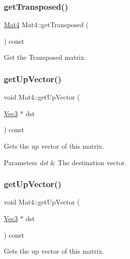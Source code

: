 \subsubsection{\texorpdfstring{get\+Transposed()}{getTransposed()}\hspace{0.1cm}{\footnotesize\ttfamily [2/2]}}
{\footnotesize\ttfamily \hyperlink{classMat4}{Mat4} Mat4\+::get\+Transposed (\begin{DoxyParamCaption}{ }\end{DoxyParamCaption}) const}

Get the Transposed matrix. \mbox{\label{classMat4_af0d374798883b8b0315025707df6329d}} 
\subsubsection{\texorpdfstring{get\+Up\+Vector()}{getUpVector()}\hspace{0.1cm}{\footnotesize\ttfamily [1/2]}}
{\footnotesize\ttfamily void Mat4\+::get\+Up\+Vector (\begin{DoxyParamCaption}\item[{\hyperlink{classVec3}{Vec3} $\ast$}]{dst }\end{DoxyParamCaption}) const}

Gets the up vector of this matrix.


\begin{DoxyParams}{Parameters}
{\em dst} & The destination vector. \\
\hline
\end{DoxyParams}
\mbox{\label{classMat4_af0d374798883b8b0315025707df6329d}} 
\subsubsection{\texorpdfstring{get\+Up\+Vector()}{getUpVector()}\hspace{0.1cm}{\footnotesize\ttfamily [2/2]}}
{\footnotesize\ttfamily void Mat4\+::get\+Up\+Vector (\begin{DoxyParamCaption}\item[{\hyperlink{classVec3}{Vec3} $\ast$}]{dst }\end{DoxyParamCaption}) const}

Gets the up vector of this matrix.


